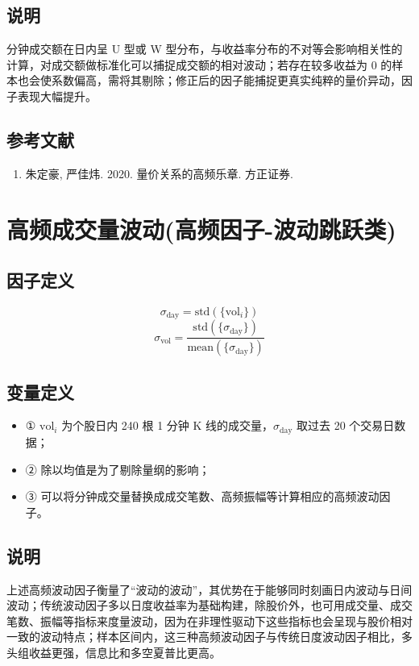 \documentclass{article}
\begin{document}
\subsection{说明}
分钟成交额在日内呈 U 型或 W 型分布，与收益率分布的不对等会影响相关性的计算，对成交额做标准化可以捕捉成交额的相对波动；若存在较多收益为 0 的样本也会使系数偏高，需将其剔除；修正后的因子能捕捉更真实纯粹的量价异动，因子表现大幅提升。

\subsection{参考文献}
\begin{enumerate}
    \item 朱定豪, 严佳炜. 2020. 量价关系的高频乐章. 方正证券.
\end{enumerate}

\section{高频成交量波动(高频因子-波动跳跃类)}

\subsection{因子定义}
\begin{equation}
    \sigma_{\mathrm{day}} = \mathrm{std}(\{\mathrm{vol}_i\})
\end{equation}
\begin{equation}
    \sigma_{\mathrm{vol}} = \frac{\mathrm{std}(\{\sigma_{\mathrm{day}}\})}{\mathrm{mean}(\{\sigma_{\mathrm{day}}\})}
\end{equation}

\subsection{变量定义}
\begin{itemize}
    \item ① \( \mathrm{vol}_i \) 为个股日内 240 根 1 分钟 K 线的成交量，\( \sigma_{\mathrm{day}} \) 取过去 20 个交易日数据；
    \item ② 除以均值是为了剔除量纲的影响；
    \item ③ 可以将分钟成交量替换成成交笔数、高频振幅等计算相应的高频波动因子。
\end{itemize}

\subsection{说明}
上述高频波动因子衡量了“波动的波动”，其优势在于能够同时刻画日内波动与日间波动；传统波动因子多以日度收益率为基础构建，除股价外，也可用成交量、成交笔数、振幅等指标来度量波动，因为在非理性驱动下这些指标也会呈现与股价相对一致的波动特点；样本区间内，这三种高频波动因子与传统日度波动因子相比，多头组收益更强，信息比和多空夏普比更高。
\end{document}
